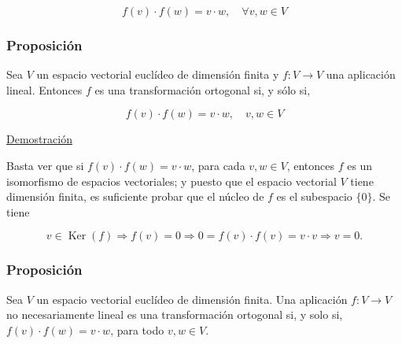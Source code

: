 \documentclass[12pt, a4paper, ones, notitlepage, openany,titlepage]{article}
\begin{document}
$$
f(v) \cdot f(w)=v \cdot w, \quad \forall v, w \in V
$$

\subsubsection{Proposición}
Sea $V$ un espacio vectorial euclídeo de dimensión finita y $f: V \rightarrow V$ una aplicación lineal. Entonces $f$ es una transformación ortogonal si, y sólo si,

$$
f(v) \cdot f(w)=v \cdot w, \quad v, w \in V
$$

\noindent\underline{Demostración}

Basta ver que si $f(v) \cdot f(w)=v \cdot w$, para cada $v, w \in V$, entonces $f$ es un isomorfismo de espacios vectoriales; y puesto que el espacio vectorial $V$ tiene dimensión finita, es suficiente probar que el núcleo de $f$ es el subespacio $\{0\}$. Se tiene

$$
v \in \operatorname{Ker}(f) \Longrightarrow f(v)=0 \Longrightarrow 0=f(v) \cdot f(v)=v \cdot v \Longrightarrow v=0 .
$$

\subsubsection{Proposición}
Sea $V$ un espacio vectorial euclídeo de dimensión finita. Una aplicación $f: V \rightarrow V$ no necesariamente lineal es una transformación ortogonal si, y solo si, $f(v) \cdot f(w)=v \cdot w$, para todo $v, w \in V$.\\
\end{document}
